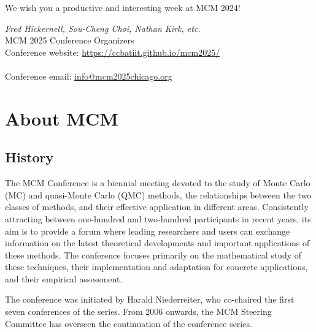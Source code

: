 We wish you a productive and interesting week at MCM 2024!


\bigskip
\emph{Fred Hickernell, Sou-Cheng Choi, Nathan Kirk, etc.} \\
MCM 2025 Conference Organizers \\




\vspace{5cm}
Conference website: \url{https://ccbatiit.github.io/mcm2025/} \\
\\
Conference email: \url{info@mcm2025chicago.org}

\thispagestyle{empty} \tableofcontents

\section{About MCM}

\subsection{History}

The MCM Conference is a biennial meeting devoted to the study of Monte
Carlo (MC) and quasi-Monte Carlo (QMC) methods, the relationships between
the two classes of methods, and their effective application in different
areas. Consistently attracting between one-hundred and two-hundred participants in recent years, its aim
is to provide a forum where leading researchers and users can exchange
information on the latest theoretical developments and important
applications of these methods. The conference focuses primarily
on the mathematical study of these techniques, their implementation and
adaptation for concrete applications, and their empirical assessment.

The conference was initiated by Harald Niederreiter, who co-chaired the
first seven conferences of the series. From 2006 onwards, the MCM Steering Committee has
overseen the continuation of the conference series.

